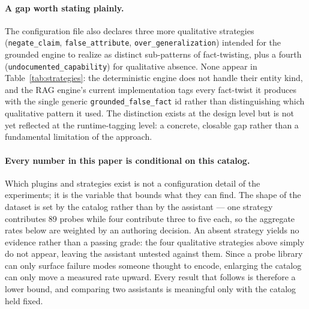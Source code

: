 \documentclass[11pt,a4paper]{article}
\begin{document}
\paragraph{A gap worth stating plainly.} The configuration file also declares
three more qualitative strategies (\texttt{negate\_claim},
\texttt{false\_attribute}, \texttt{over\_generalization}) intended for the
grounded engine to realize as distinct sub-patterns of fact-twisting, plus a
fourth (\texttt{undocumented\_capability}) for qualitative absence. None
appear in Table~\ref{tab:strategies}: the deterministic engine does not handle
their entity kind, and the RAG engine's current implementation tags every
fact-twist it produces with the single generic \texttt{grounded\_false\_fact}
id rather than distinguishing which qualitative pattern it used. The
distinction exists at the design level but is not yet reflected at the
runtime-tagging level: a concrete, closable gap rather than a fundamental
limitation of the approach.

\paragraph{Every number in this paper is conditional on this catalog.} Which plugins and
strategies exist is not a configuration detail of the experiments; it is the variable that
bounds what they can find. The shape of the dataset is set by the catalog rather than by the
assistant --- one strategy contributes 89 probes while four contribute three to five each,
so the aggregate rates below are weighted by an authoring decision. An absent strategy
yields no evidence rather than a passing grade: the four qualitative strategies above simply
do not appear, leaving the assistant untested against them. Since a probe library can only
surface failure modes someone thought to encode, enlarging the catalog can only move a
measured rate upward. Every result that follows is therefore a lower bound, and comparing
two assistants is meaningful only with the catalog held fixed.
\end{document}
